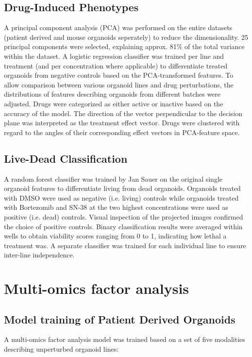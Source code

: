 \begin{flushleft}
\subsection{Drug-Induced Phenotypes}
A principal component analysis (PCA) was performed on the entire datasets (patient derived and mouse organoids seperately) to reduce the dimensionality. 25 principal components were selected, explaining approx. 81\% of the total variance within the dataset. A logistic regression classifier was trained per line and treatment (and per concentration where applicable) to differentiate treated organoids from negative controls based on the PCA-transformed features. To allow comparison between various organoid lines and drug perturbations, the distributions of features describing organoids from different batches were adjusted. Drugs were categorized as either active or inactive based on the accuracy of the model. The direction of the vector perpendicular to the decision plane was interpreted as the treatment effect vector. Drugs were clustered with regard to the angles of their corresponding effect vectors in PCA-feature space.

\subsection{Live-Dead Classification}
A random forest classifier was trained by Jan Sauer on the original single organoid features to differentiate living from dead organoids. Organoids treated with DMSO were used as negative (i.e. living) controls while organoids treated with Bortezomib and SN-38 at the two highest concentrations were used as positive (i.e. dead) controls. Visual inspection of the projected images confirmed the choice of positive controls. Binary classification results were averaged within wells to obtain viability scores ranging from 0 to 1, indicating how lethal a treatment was. A separate classifier was trained for each individual line to ensure inter-line independence.


\section{Multi-omics factor analysis}
\subsection{Model training of Patient Derived Organoids}
A multi-omics factor analysis model was trained based on a set of five modalities describing unperturbed organoid lines:


\end{flushleft}
